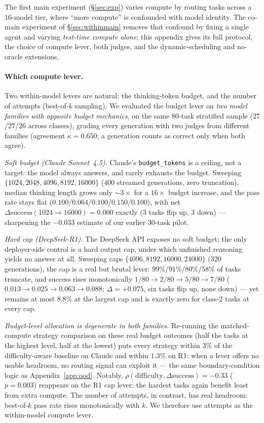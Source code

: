 \documentclass{article}
\begin{document}
The first main experiment (\S\ref{sec:exp}) varies compute by
routing tasks across a $16$-model tier, where ``more compute'' is
confounded with model identity. The co-main experiment of
\S\ref{sec:withinmain} removes that confound by fixing a single agent
and varying \emph{test-time compute alone}; this appendix gives its
full protocol, the choice of compute lever, both judges, and the
dynamic-scheduling and no-oracle extensions.

\paragraph{Which compute lever.} Two within-model levers are natural:
the thinking-token budget, and the number of attempts (best-of-$k$
sampling). We evaluated the budget lever on \emph{two model families
with opposite budget mechanics}, on the same $80$-task stratified
sample ($27$/$27$/$26$ across classes), grading every generation with
two judges from different families (agreement $\kappa = 0.650$; a
generation counts as correct only when both agree).

\emph{Soft budget (Claude Sonnet~4.5).} Claude's
\texttt{budget\_tokens} is a ceiling, not a target: the model always
answers, and rarely exhausts the budget. Sweeping
$\{1024, 2048, 4096, 8192, 16000\}$ ($400$ streamed generations,
zero truncation), median thinking length grows only ${\sim}3\times$
for a $16\times$ budget increase, and the pass rate stays flat
($0.100$/$0.064$/$0.100$/$0.150$/$0.100$), with net
$\Delta\mathrm{success}(1024{\to}16000) = 0.000$ exactly ($3$ tasks
flip up, $3$ down) --- sharpening the $-0.033$ estimate of our
earlier $30$-task pilot.

\emph{Hard cap (DeepSeek-R1).} The DeepSeek API exposes no soft
budget; the only deployer-side control is a hard output cap, under
which unfinished reasoning yields no answer at all. Sweeping caps
$\{4096, 8192, 16000, 24000\}$ ($320$ generations), the cap is a
real but brutal lever: $99\%$/$91\%$/$80\%$/$58\%$ of tasks
truncate, and success rises monotonically
$1/80 \to 2/80 \to 5/80 \to 7/80$ ($0.013 \to 0.025 \to 0.063 \to
0.088$; $\Delta = +0.075$, six tasks flip up, none down) --- yet
remains at most $8.8\%$ at the largest cap and is exactly zero for class-$2$ tasks at every cap.

\emph{Budget-level allocation is degenerate in both families.}
Re-running the matched-compute strategy comparison on these real
budget outcomes (half the tasks at the highest level, half at the
lowest) puts every strategy within $3\%$ of the difficulty-aware
baseline on Claude and within $1.3\%$ on R1: when a lever offers no usable headroom, no
routing signal can exploit it --- the same boundary-condition logic
as Appendix~\ref{app:ood}. Notably,
$\rho(\mathrm{difficulty}, \Delta\mathrm{success}) = -0.33$
($p = 0.003$) reappears on the R1 cap lever: the hardest tasks again
benefit least from extra compute. The number of attempts, in
contrast, has real headroom: best-of-$k$ pass rate rises
monotonically with $k$. We therefore use attempts as the
within-model compute lever.
\end{document}
